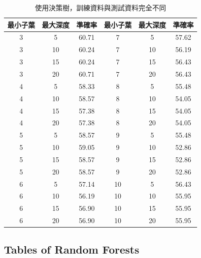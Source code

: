 \documentclass[11pt,a4paper]{extarticle}
\begin{document}
    \begin{table}[H]
        \centering
        \caption{使用決策樹，訓練資料與測試資料完全不同}\label{tab2}
        \vspace{1em}
        \begin{tabular}{ccc|ccc}
            \toprule
             最小子葉 &  最大深度 & 準確率 &  最小子葉 &  最大深度 & 準確率\\
            \midrule
            \hline
                3  &  5  &  60.71 \text{\%}  &  7  &  5  &  57.62 \text{\%}  \\
                3  & 10  &  60.24 \text{\%}  &  7  & 10  &  56.19 \text{\%}  \\
                3  & 15  &  60.24 \text{\%}  &  7  & 15  &  56.43 \text{\%}  \\
                3  & 20  &  60.71 \text{\%}  &  7  & 20  &  56.43 \text{\%}  \\
                4  &  5  &  58.33 \text{\%}  &  8  &  5  &  55.48 \text{\%}  \\
                4  & 10  &  58.57 \text{\%}  &  8  & 10  &  54.05 \text{\%}  \\
                4  & 15  &  57.38 \text{\%}  &  8  & 15  &  54.05 \text{\%}  \\
                4  & 20  &  57.38 \text{\%}  &  8  & 20  &  54.05 \text{\%}  \\
                5  &  5  &  58.57 \text{\%}  &  9  &  5  &  55.48 \text{\%}  \\
                5  & 10  &  59.05 \text{\%}  &  9  & 10  &  52.86 \text{\%}  \\
                5  & 15  &  58.57 \text{\%}  &  9  & 15  &  52.86 \text{\%}  \\
                5  & 20  &  58.57 \text{\%}  &  9  & 20  &  52.86 \text{\%}  \\
                6  &  5  &  57.14 \text{\%}  & 10  &  5  &  56.43 \text{\%}  \\
                6  & 10  &  56.19 \text{\%}  & 10  & 10  &  55.95 \text{\%}  \\
                6  & 15  &  56.90 \text{\%}  & 10  & 15  &  55.95 \text{\%}  \\
                6  & 20  &  56.90 \text{\%}  & 10  & 20  &  55.95 \text{\%}  \\
            \bottomrule
            \end{tabular}
    \end{table}

    \subsection*{Tables of Random Forests}
\end{document}
